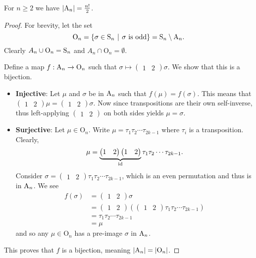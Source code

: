 \begin{proposition}\label{prop-order-of-An}
    For $n \geq 2$ we have $|\mathrm{A}_{n}| = \frac{n!}2$.
\end{proposition}
\begin{proof}
    For brevity, let the set
    \[
        \mathrm{O}_n = \left\{\sigma \in \Sn{n} \vert \sigma \text{ is odd}\right\} = \Sn{n} \setminus \An{n}.
    \]
    Clearly $A_n \cup \mathrm{O}_n = \mathrm{S}_{n}$ and $A_n \cap \mathrm{O}_n = \emptyset$.

    Define a map $f: \mathrm{A}_{n} \to \mathrm{O}_n$ such that $\sigma \mapsto \begin{pmatrix}1 & 2\end{pmatrix}\sigma$. We show that this is a bijection.
    \begin{itemize}
        \item \textbf{Injective}: Let $\mu$ and $\sigma$ be in $\mathrm{A}_{n}$ such that $f(\mu) = f(\sigma)$. This means that $\begin{pmatrix}1 & 2\end{pmatrix}\mu = \begin{pmatrix}1 & 2\end{pmatrix}\sigma$. Now since transpositions are their own self-inverse, thus left-applying $\begin{pmatrix}1 & 2\end{pmatrix}$ on both sides yields $\mu = \sigma$.

        \item \textbf{Surjective}: Let $\mu \in \mathrm{O}_n$. Write $\mu = \tau_1\tau_2\cdots\tau_{2k-1}$ where $\tau_i$ is a transposition. Clearly,
        \[
            \mu = \underbrace{\begin{pmatrix}1 & 2\end{pmatrix}\begin{pmatrix}1 & 2\end{pmatrix}}_{\mathrm{id}}\tau_1\tau_2\cdots\tau_{2k-1}.
        \]
        Consider $\sigma = \begin{pmatrix}1 & 2\end{pmatrix}\tau_1\tau_2\cdots\tau_{2k-1}$, which is an even permutation and thus is in $\mathrm{A}_{n}$. We see
        \begin{align*}
            f(\sigma) &= \begin{pmatrix}1 & 2\end{pmatrix}\sigma\\
            &= \begin{pmatrix}1 & 2\end{pmatrix}\left(\begin{pmatrix}1 & 2\end{pmatrix}\tau_1\tau_2\cdots\tau_{2k-1}\right)\\
            &= \tau_1\tau_2\cdots\tau_{2k-1}\\
            &= \mu
        \end{align*}
        and so any $\mu \in \mathrm{O}_n$ has a pre-image $\sigma$ in $\mathrm{A}_{n}$.
    \end{itemize}
    This proves that $f$ is a bijection, meaning $|\mathrm{A}_{n}| = |\mathrm{O}_n|$.


\end{proof}

